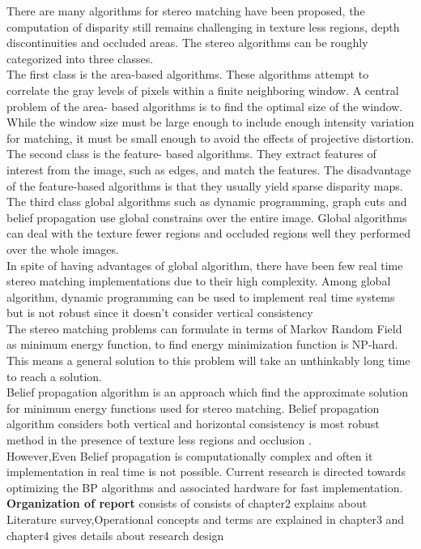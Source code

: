 There are many algorithms for stereo matching have been proposed, the computation of disparity still remains challenging in texture less regions, depth discontinuities and occluded areas. The stereo algorithms can be roughly categorized into three classes.\\
The first class is the area-based algorithms. These algorithms attempt to correlate the gray levels of pixels within a finite neighboring window. A central problem of the area- based algorithms is to find the optimal size of the window. While the window size must be large enough to include enough intensity variation for matching, it must be small enough to avoid the effects of projective distortion.\\
The second class is the feature- based algorithms. They extract features of interest from the image, such as edges, and match the features. The disadvantage of the feature-based algorithms is that they usually yield sparse disparity maps.\\
The third class global algorithms such as dynamic programming, graph cuts and belief propagation use global constrains over the entire image. Global algorithms can deal with the texture fewer regions and occluded regions well they performed over the whole images.\\
In spite of having advantages of global algorithm, there have been few real time stereo matching implementations due to their high complexity. Among global algorithm, dynamic programming can be used to implement real time systems but is not robust since it doesn't consider vertical consistency\\
The stereo matching problems can formulate in terms of Markov Random Field as minimum energy function, to find energy minimization function is NP-hard. This means a general solution to this problem will take an unthinkably long time to reach a solution.\\
Belief propagation algorithm is an approach which find the approximate solution for minimum energy functions used for stereo matching.
Belief propagation algorithm considers both vertical and horizontal consistency is most robust method in the presence of texture less regions and occlusion .\\
However,Even  Belief propagation is computationally complex and often it implementation in real time is not possible.
Current research is directed towards optimizing the BP algorithms and associated hardware for fast implementation.
 \\\textbf{Organization of report} consists of consists of chapter2 explains about Literature survey,Operational concepts and terms  are explained in chapter3 and chapter4 gives details about research design 